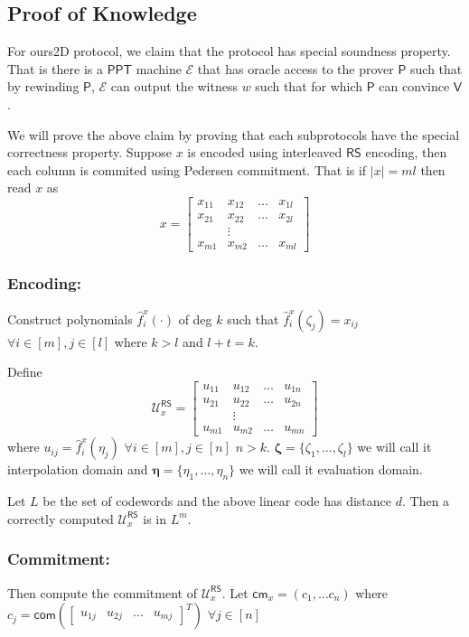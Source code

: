 \documentclass[runningheads]{llncs}
\newcommand{\name}{\textsf{ours}}
\def\ppt{\mathsf{PPT}}
\def\extrac{\mathcal{E}}
\def\prover{\mathsf{P}}
\def\verifier{\mathsf{V}}
\def\RS{\mathsf{RS}} %
\def\cm{\mathsf{cm}} %
\def\com{\mathsf{com}} %
\def\oracle{\mathcal{U}^{\RS}}
\begin{document}
\subsection{Proof of Knowledge}
	For \name2D protocol, we claim that the protocol has special soundness property. That is there is a $\ppt$ machine $\extrac$ that has oracle access to the prover $\prover$ such that by rewinding $\prover$, $\extrac$ can output the witness $w$ such that for which $\prover$ can convince $\verifier$.
	
	We will prove the above claim by proving that each subprotocols have the special correctness property. 
	Suppose $x$ is encoded using interleaved $\RS$ encoding, then each column is commited using Pedersen commitment. That is if $|x|=ml$ then read $x$ as 
	$$x=
	\begin{bmatrix}
		x_{11} & x_{12} & \ldots & x_{1l}\\
		x_{21} & x_{22} & \ldots & x_{2l}\\
		& \vdots\\
		x_{m1} & x_{m2} & \ldots & x_{ml}
	\end{bmatrix}
	$$	
	\subsubsection{Encoding:}\label{subsec: encode} Construct polynomials $\hat{f}^x_i(\cdot)$ of deg $k$ such that $\hat{f}^x_i(\zeta_j)=x_{ij}$ $\forall i\in [m], j\in [l]$ where $k>l$ and $l+t=k$.
	
	Define 
	$$\oracle_x =
	\begin{bmatrix}
		u_{11} & u_{12} & \ldots & u_{1n}\\
		u_{21} & u_{22} & \ldots & u_{2n}\\
		& \vdots\\
		u_{m1} & u_{m2} & \ldots & u_{mn}
	\end{bmatrix}
	$$
	where $u_{ij}= \hat{f}^x_i(\eta_j)$ $\forall i\in[m], j\in[n]$ $n>k$. $\bm{\zeta}=\{\zeta_1,\ldots,\zeta_l\}$ we will call it interpolation domain and $\bm{\eta} = \{\eta_1,\ldots,\eta_n\}$ we will call it evaluation domain. 
	
	Let $L$ be the set of codewords and the above linear code has distance $d$. Then a correctly computed $\oracle_x$ is in $L^m$.
	
	\subsubsection{Commitment:}\label{subsec: commit} Then compute the commitment of $\oracle_x$. Let $\cm_x=(c_1,\ldots c_n)$ where $c_j= \com( \begin{bmatrix}
	u_{1j} & u_{2j} & \ldots & u_{mj}
	\end{bmatrix}^T)$ $\forall j\in [n]$
	
\end{document}
